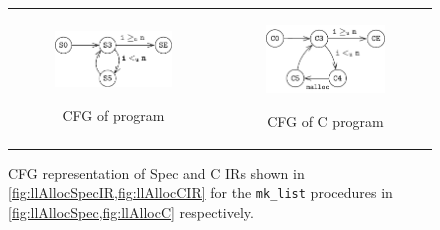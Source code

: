 \begin{figure}
\begin{tabular}{@{}c@{}c@{}}
\begin{subfigure}[b]{0.5\textwidth}
\begin{center}
{\includegraphics[scale=1.4]{chapters/figures/figMallocSpecCfg.pdf}}
\vspace{15pt}
\end{center}
\caption{\label{fig:llAllocSpecIRCFG}CFG of \SpecL{} program}
\end{subfigure}%
&
\begin{subfigure}[b]{0.5\textwidth}
\begin{center}
{\includegraphics[scale=1.4]{chapters/figures/figMallocCCfg.pdf}}
\end{center}
\caption{\label{fig:llAllocCCFG}CFG of C program}
\end{subfigure}%
\\
\end{tabular}
\caption{\label{fig:mallocSpecCFGAndCCFG}CFG representation of Spec and C IRs shown in \cref{fig:llAllocSpecIR,fig:llAllocCIR} for the {\tt mk\_list} procedures in \cref{fig:llAllocSpec,fig:llAllocC} respectively.}
\end{figure}
